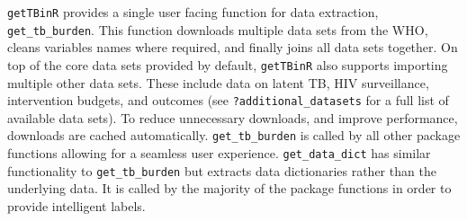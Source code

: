 \documentclass[11pt,twoside]{bristolthesis}
\begin{document}
  \texttt{getTBinR} provides a single user facing function for data extraction, \texttt{get\_tb\_burden}. This function downloads multiple data sets from the WHO, cleans variables names where required, and finally joins all data sets together. On top of the core data sets provided by default, \texttt{getTBinR} also supports importing multiple other data sets. These include data on latent TB, HIV surveillance, intervention budgets, and outcomes (see \texttt{?additional\_datasets} for a full list of available data sets). To reduce unnecessary downloads, and improve performance, downloads are cached automatically. \texttt{get\_tb\_burden} is called by all other package functions allowing for a seamless user experience. \texttt{get\_data\_dict} has similar functionality to \texttt{get\_tb\_burden} but extracts data dictionaries rather than the underlying data. It is called by the majority of the package functions in order to provide intelligent labels.
  
\end{document}
